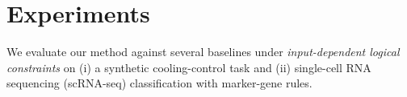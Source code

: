 \documentclass{article}
\newcommand {\cl}[1]{{\color{blue}{(Can: #1}}}
\theoremstyle{plain}
\theoremstyle{definition}
\theoremstyle{remark}
\begin{document}
 












\section{Experiments}
We evaluate our method against several baselines under \emph{input-dependent logical constraints} on (i) a synthetic cooling-control task and (ii) single-cell RNA sequencing (scRNA-seq) classification with marker-gene rules. 
\end{document}
